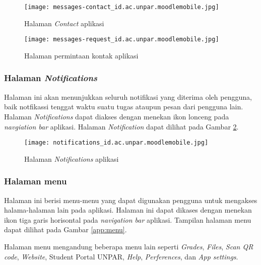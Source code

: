 \begin{figure}[H]
\centering
\begin{minipage}{.3\textwidth} 
	\centering  
	\texttt{[image: messages-contact\_id.ac.unpar.moodlemobile.jpg]}  
	\caption[Halaman \textit{Contact} aplikasi] {Halaman \textit{Contact} aplikasi} 
	\label{app:messages:contact} 
\end{minipage}
\hspace{.2\textwidth}
\begin{minipage}{.3\textwidth}
	\centering  
	\texttt{[image: messages-request\_id.ac.unpar.moodlemobile.jpg]}  
	\caption[Halaman permintaan kontak aplikasi] {Halaman permintaan kontak aplikasi} 
	\label{app:messages:request} 
\end{minipage}
\end{figure}

\subsubsection{Halaman \textit{Notifications}}

Halaman ini akan menunjukkan seluruh notifikasi yang diterima oleh pengguna, baik notfikassi tenggat waktu suatu tugas ataupun pesan dari pengguna lain. Halaman \textit{Notifications} dapat diakses dengan menekan ikon lonceng pada \textit{navgiation bar} aplikasi. Halaman \textit{Notification} dapat dilihat pada Gambar \ref{app:notifications}.


\begin{figure}[H] 
	\centering  
	\texttt{[image: notifications\_id.ac.unpar.moodlemobile.jpg]}  
	\caption[Halaman \textit{Notifications} aplikasi] {Halaman \textit{Notifications} aplikasi} 
	\label{app:notifications} 
\end{figure}  

\subsubsection{Halaman menu}

Halaman ini berisi menu-menu yang dapat digunakan pengguna untuk mengakses halama-halaman lain pada aplikasi. Halaman ini dapat dikases dengan menekan ikon tiga garis horisontal pada \textit{navigation bar} aplikasi. Tampilan halaman menu dapat dilihat pada Gambar \ref{app:menu}.

Halaman menu mengandung beberapa menu lain seperti \textit{Grades}, \textit{Files}, \textit{Scan QR code}, \textit{Website}, Student Portal UNPAR, \textit{Help}, \textit{Perferences}, dan \textit{App settings}.

